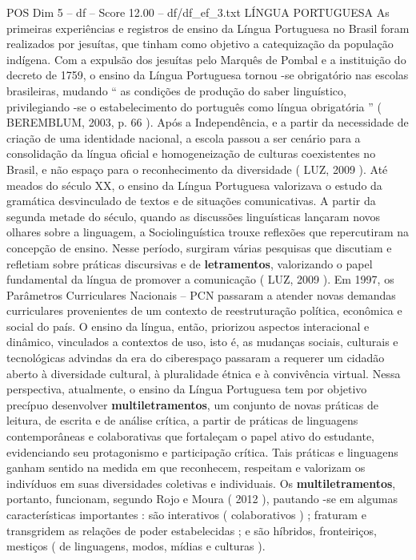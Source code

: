 \begin{textsample}{POS Dim 5 – df – Score 12.00 – df/df\_ef\_3.txt}  \label{ex:f5_pos_151}
LÍNGUA PORTUGUESA As primeiras experiências e registros de ensino da Língua Portuguesa no Brasil foram realizados por jesuítas, que tinham como objetivo a catequização da população indígena.
Com a expulsão dos jesuítas pelo Marquês de Pombal e a instituição do decreto de 1759, o ensino da Língua Portuguesa tornou -se obrigatório nas escolas brasileiras, mudando “ as condições de produção do saber linguístico, privilegiando -se o estabelecimento do português como língua obrigatória ” ( BEREMBLUM, 2003, p. 66 ).
Após a Independência, e a partir da necessidade de criação de uma identidade nacional, a escola passou a ser cenário para a consolidação da língua oficial e homogeneização de culturas coexistentes no Brasil, e não espaço para o reconhecimento da diversidade ( LUZ, 2009 ).
Até meados do século XX, o ensino da Língua Portuguesa valorizava o estudo da gramática desvinculado de textos e de situações comunicativas.
A partir da segunda metade do século, quando as discussões linguísticas lançaram novos olhares sobre a linguagem, a Sociolinguística trouxe reflexões que repercutiram na concepção de ensino.
Nesse período, surgiram várias pesquisas que discutiam e refletiam sobre práticas discursivas e de \textbf{letramentos}, valorizando o papel fundamental da língua de promover a comunicação ( LUZ, 2009 ).
Em 1997, os Parâmetros Curriculares Nacionais – PCN passaram a atender novas demandas curriculares provenientes de um contexto de reestruturação política, econômica e social do país.
O ensino da língua, então, priorizou aspectos interacional e dinâmico, vinculados a contextos de uso, isto é, as mudanças sociais, culturais e tecnológicas advindas da era do ciberespaço passaram a requerer um cidadão aberto à diversidade cultural, à pluralidade étnica e à convivência virtual.
Nessa perspectiva, atualmente, o ensino da Língua Portuguesa tem por objetivo precípuo desenvolver \textbf{multiletramentos}, um conjunto de novas práticas de leitura, de escrita e de análise crítica, a partir de práticas de linguagens contemporâneas e colaborativas que fortaleçam o papel ativo do estudante, evidenciando seu protagonismo e participação crítica.
Tais práticas e linguagens ganham sentido na medida em que reconhecem, respeitam e valorizam os indivíduos em suas diversidades coletivas e individuais.
Os \textbf{multiletramentos}, portanto, funcionam, segundo Rojo e Moura ( 2012 ), pautando -se em algumas características importantes : são interativos ( colaborativos ) ; fraturam e transgridem as relações de poder estabelecidas ; e são híbridos, fronteiriços, mestiços ( de linguagens, modos, mídias e culturas ).

\end{textsample}
